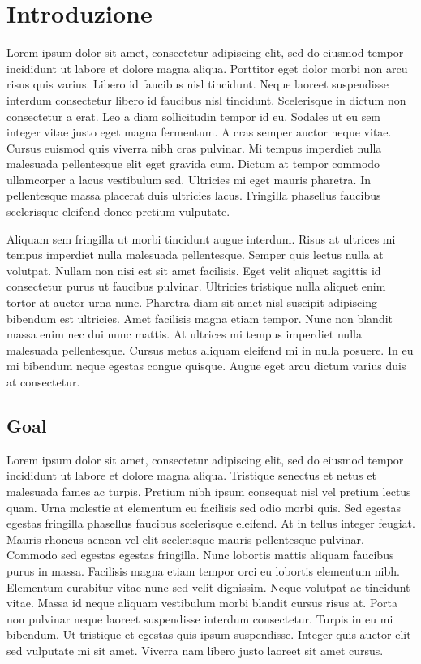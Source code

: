 
\chapter{Introduzione}
\label{sec:introduction}

Lorem ipsum dolor sit amet, consectetur adipiscing elit, sed do eiusmod tempor incididunt ut labore et dolore magna aliqua. Porttitor eget dolor morbi non arcu risus quis varius. Libero id faucibus nisl tincidunt. Neque laoreet suspendisse interdum consectetur libero id faucibus nisl tincidunt. Scelerisque in dictum non consectetur a erat. Leo a diam sollicitudin tempor id eu. Sodales ut eu sem integer vitae justo eget magna fermentum. A cras semper auctor neque vitae. Cursus euismod quis viverra nibh cras pulvinar. Mi tempus imperdiet nulla malesuada pellentesque elit eget gravida cum. Dictum at tempor commodo ullamcorper a lacus vestibulum sed. Ultricies mi eget mauris pharetra. In pellentesque massa placerat duis ultricies lacus. Fringilla phasellus faucibus scelerisque eleifend donec pretium vulputate.

Aliquam sem fringilla ut morbi tincidunt augue interdum. Risus at ultrices mi tempus imperdiet nulla malesuada pellentesque. Semper quis lectus nulla at volutpat. Nullam non nisi est sit amet facilisis. Eget velit aliquet sagittis id consectetur purus ut faucibus pulvinar. Ultricies tristique nulla aliquet enim tortor at auctor urna nunc. Pharetra diam sit amet nisl suscipit adipiscing bibendum est ultricies. Amet facilisis magna etiam tempor. Nunc non blandit massa enim nec dui nunc mattis. At ultrices mi tempus imperdiet nulla malesuada pellentesque. Cursus metus aliquam eleifend mi in nulla posuere. In eu mi bibendum neque egestas congue quisque. Augue eget arcu dictum varius duis at consectetur.

\section[Goal]{Goal}

Lorem ipsum dolor sit amet, consectetur adipiscing elit, sed do eiusmod tempor incididunt ut labore et dolore magna aliqua. Tristique senectus et netus et malesuada fames ac turpis. Pretium nibh ipsum consequat nisl vel pretium lectus quam. Urna molestie at elementum eu facilisis sed odio morbi quis. Sed egestas egestas fringilla phasellus faucibus scelerisque eleifend. At in tellus integer feugiat. Mauris rhoncus aenean vel elit scelerisque mauris pellentesque pulvinar. Commodo sed egestas egestas fringilla. Nunc lobortis mattis aliquam faucibus purus in massa. Facilisis magna etiam tempor orci eu lobortis elementum nibh. Elementum curabitur vitae nunc sed velit dignissim. Neque volutpat ac tincidunt vitae. Massa id neque aliquam vestibulum morbi blandit cursus risus at. Porta non pulvinar neque laoreet suspendisse interdum consectetur. Turpis in eu mi bibendum. Ut tristique et egestas quis ipsum suspendisse. Integer quis auctor elit sed vulputate mi sit amet. Viverra nam libero justo laoreet sit amet cursus.

